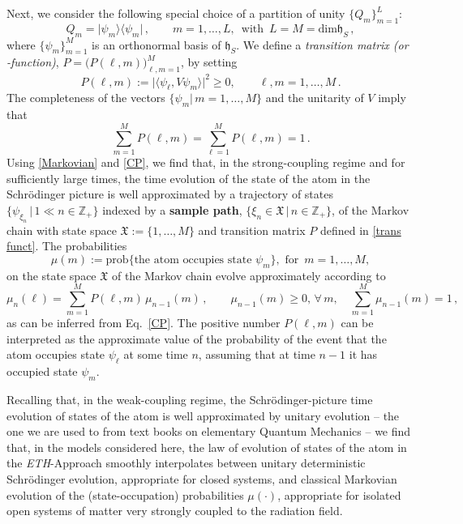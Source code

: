 \documentclass[12pt]{article}
\begin{document}
{Next, we consider the following special choice of a partition of unity $\big\{Q_{m}\big\}_{m=1}^{L}$:
\begin{equation}\label{rank 1}
Q_m = \vert \psi_m \rangle \langle \psi_m \vert\,, \qquad m=1,\dots, L, \,\text{ with }\, L=M=\text{dim}\mathfrak{h}_S\,,
\end{equation}
where $\big\{\psi_m\big\}_{m=1}^{M}$ is an orthonormal basis of $\mathfrak{h}_S$. We define a 
\textit{transition matrix (or -function)}, 
$P=\big(P(\ell, m)\big)_{\ell, m=1}^{M}$, by setting
\begin{equation}\label{trans funct}
P(\ell, m):= \vert \langle \psi_\ell, V \psi_m \rangle \vert^{2} \geq 0, \qquad \ell, m = 1,\dots, M\,.
\end{equation}
The completeness of the vectors $\big\{\psi_m \vert \,m=1,\dots, M\big\}$ and the unitarity of $V$ imply that
\begin{equation}\label{proba}
\sum_{m=1}^{M} P(\ell,m) = \sum_{\ell=1}^{M} P(\ell, m) =1\,.
\end{equation}
Using \eqref{Markovian} and \eqref{CP}, we find that, in the strong-coupling regime and for sufficiently large times,  
the time evolution of the state of the atom in the Schr\"odinger picture is well approximated by a trajectory of states 
$\big\{ \psi_{\xi_{n}} \,\vert\, 1\ll n\in \mathbb{Z}_{+}\big\}$ indexed by a {\bf{sample path}}, 
$\big\{\xi_{n} \in \mathfrak{X}\,\vert\, n \in \mathbb{Z}_{+} \big\}$, of the Markov chain with state space 
$\mathfrak{X}:=\big\{1, \dots, M\big\}$ and transition matrix $P$ defined in \eqref{trans funct}. The probabilities
$$\mu(m) := \text{prob}\big\{\text{the atom occupies state } \psi_m\big\}, \text{ for }\,m=1,\dots, M,$$
on the state space $\mathfrak{X}$ of the Markov chain evolve approximately according to 
\begin{equation}\label{Markov chain}
\mu_{n}(\ell)= \sum_{m=1}^{M} P(\ell, m)\, \mu_{n-1}(m)\,, \qquad \mu_{n-1}(m)\geq 0, \, \forall\, m, \quad \sum_{m=1}^{M}\mu_{n-1}(m)=1\,,
\end{equation}
as can be inferred from Eq.~\eqref{CP}. The positive number $P(\ell, m)$ can be interpreted as the approximate value 
of the probability of the event that the atom occupies state $\psi_{\ell}$ at some time $n$, assuming that at time $n-1$ 
it has occupied state $\psi_{m}$.

Recalling that, in the weak-coupling regime, the Schr\"odinger-picture time evolution of states of the 
atom is well approximated by unitary evolution -- the one we are used to from text books on elementary Quantum 
Mechanics -- we find that, in the models considered here, the law of evolution of states of the atom in the \textit{ETH}-Approach 
smoothly interpolates between unitary deterministic Schr\"odinger evolution, appropriate for closed systems, and classical 
Markovian evolution of the (state-occupation) probabilities $\mu(\cdot)$, appropriate for isolated open systems of matter very strongly coupled to the radiation field.\\

}
\end{document}
